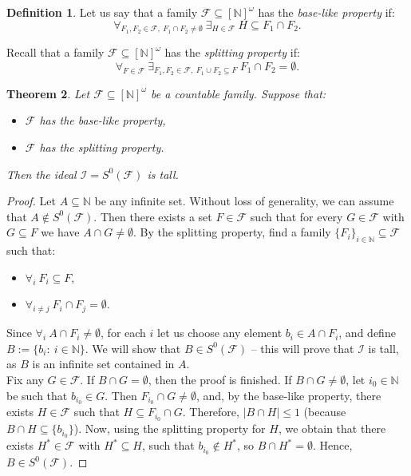 \documentclass{amsart}
\newtheorem{thm}{Theorem}[section]
\theoremstyle{definition}
\newtheorem{df}[thm]{Definition}
\newcommand{\N}{{\mathbb N}}
\newcommand{\I}{\mathcal I}
\newcommand{\InfSubs}{[\N]^{\omega}}
\newcommand{\MB}{S^0}
\begin{document}
\begin{df}
Let us say that a family $\mathcal{F}\subseteq \InfSubs$ has the \emph{base-like property} if:
$$\forall_{F_1, F_2\in\mathcal{F},\ F_1\cap F_2\neq\emptyset}\ \exists_{H\in\mathcal{F}}\ H\subseteq F_1\cap F_2.$$
\end{df}

Recall that a family $\mathcal{F} \subseteq \InfSubs$ has the \emph{splitting property} if: 
$$\forall_{F\in\mathcal{F}}\ \exists_{F_1,F_2\in\mathcal{F},\ F_1\cup F_2 \subseteq F}\ F_1\cap F_2 = \emptyset.$$

\begin{thm} \label{thmtall}
Let $\mathcal{F}\subseteq \InfSubs$ be a countable family. Suppose that: 
\begin{itemize}
	\item[$(i)$] $\mathcal{F}$ has the base-like property,
	\item[$(ii)$] $\mathcal{F}$ has the splitting property.
\end{itemize}
Then the ideal $\I=\MB(\mathcal{F})$ is tall.
\end{thm}

\begin{proof}
Let $A \subseteq\N$ be any infinite set. 
Without loss of generality, we can assume that $A\notin \MB(\mathcal{F})$. Then there exists a set $F\in\mathcal{F}$ such that for every $G\in\mathcal{F}$ with $G\subseteq F$ we have $A\cap G \neq\emptyset$. By the splitting property, find a family $\{F_i\}_{i\in\N} \subseteq\mathcal{F}$ such that:
\begin{itemize}
\item $\forall_{i}\ F_i \subseteq F$,
\item $\forall_{i\neq j}\ F_i\cap F_j =\emptyset$.
\end{itemize}
Since $\forall_{i}\ A\cap F_i \neq\emptyset$, for each $i$ let us choose any element $b_i \in A\cap F_i$, and define $B:=\{b_i :\ i\in\N\}$. We will show that $B\in\MB(\mathcal{F})$ -- this will prove that $\I$ is tall, as $B$ is an infinite set contained in $A$.\\
Fix any $G\in \mathcal{F}$. If $B\cap G=\emptyset$, then the proof is finished. If $B\cap G \neq\emptyset$, let $i_0\in\N$ be such that $b_{i_0}\in G$. Then $F_{i_0}\cap G \neq\emptyset$, and, by the base-like property, there exists $H\in\mathcal{F}$ such that $H\subseteq F_{i_0}\cap G$. Therefore, $|B\cap H|\leq 1$ (because $B\cap H\subseteq\{b_{i_0}\}$). Now, using the splitting property for $H$, we obtain that there exists $H^*\in\mathcal{F}$ with $H^*\subseteq H$, such that $b_{i_0}\notin H^*$, so $B\cap H^* =\emptyset$. Hence, $B\in\MB(\mathcal{F})$.
\end{proof}
\end{document}
